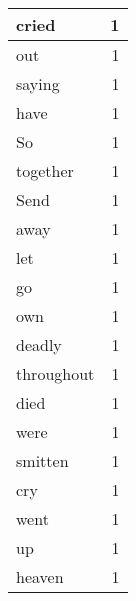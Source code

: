 \begin{center}
\begin{longtable}{l|r}
cried & 1 \\ \hline
out & 1 \\ \hline
saying & 1 \\ \hline
have & 1 \\ \hline
So & 1 \\ \hline
together & 1 \\ \hline
Send & 1 \\ \hline
away & 1 \\ \hline
let & 1 \\ \hline
go & 1 \\ \hline
own & 1 \\ \hline
deadly & 1 \\ \hline
throughout & 1 \\ \hline
died & 1 \\ \hline
were & 1 \\ \hline
smitten & 1 \\ \hline
cry & 1 \\ \hline
went & 1 \\ \hline
up & 1 \\ \hline
heaven & 1 \\ \hline
\end{longtable}
\end{center}



\normalsize



